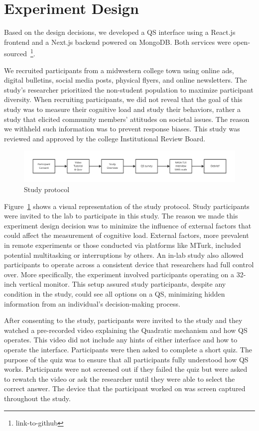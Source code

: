 \section{Experiment Design}
\label{sec:experiment}
Based on the design decisions, we developed a QS interface using a React.js frontend and a Next.js backend powered on MongoDB. Both services were open-sourced~\footnote{link-to-github}.

We recruited participants from a midwestern college town using online ads, digital bulletins, social media posts, physical flyers, and online newsletters. The study's researcher prioritized the non-student population to maximize participant diversity. When recruiting participants, we did not reveal that the goal of this study was to measure their cognitive load and study their behaviors, rather a study that elicited community members' attitudes on societal issues. The reason we withheld such information was to prevent response biases. This study was reviewed and approved by the college Institutional Review Board.

\begin{figure}[ht]
    \centering
    \includegraphics[width=1\textwidth]{content/image/study_flow.pdf}
    \caption{Study protocol}
    \label{fig:studyProtocol}
\end{figure}

Figure~\ref{fig:studyProtocol} shows a visual representation of the study protocol. Study participants were invited to the lab to participate in this study. The reason we made this experiment design decision was to minimize the influence of external factors that could affect the measurement of cognitive load. External factors, more prevalent in remote experiments or those conducted via platforms like MTurk, included potential multitasking or interruptions by others. An in-lab study also allowed participants to operate across a consistent device that researchers had full control over. More specifically, the experiment involved participants operating on a 32-inch vertical monitor. This setup assured study participants, despite any condition in the study, could see all options on a QS, minimizing hidden information from an individual's decision-making process.

After consenting to the study, participants were invited to the study and they watched a pre-recorded video explaining the Quadratic mechanism and how QS operates. This video did not include any hints of either interface and how to operate the interface. Participants were then asked to complete a short quiz. The purpose of the quiz was to ensure that all participants fully understood how QS works. Participants were not screened out if they failed the quiz but were asked to rewatch the video or ask the researcher until they were able to select the correct answer. The device that the participant worked on was screen captured throughout the study.

